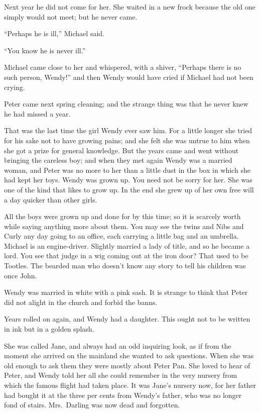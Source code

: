 Next year he did not come for her. She waited in a new frock because
the old one simply would not meet; but he never came.

``Perhaps he is ill,'' Michael said.

``You know he is never ill.''

Michael came close to her and whispered, with a shiver, ``Perhaps there
is no such person, Wendy!'' and then Wendy would have cried if Michael
had not been crying.

Peter came next spring cleaning; and the strange thing was that he
never knew he had missed a year.

That was the last time the girl Wendy ever saw him. For a little longer
she tried for his sake not to have growing pains; and she felt she was
untrue to him when she got a prize for general knowledge. But the years
came and went without bringing the careless boy; and when they met
again Wendy was a married woman, and Peter was no more to her than a
little dust in the box in which she had kept her toys. Wendy was grown
up. You need not be sorry for her. She was one of the kind that likes
to grow up. In the end she grew up of her own free will a day quicker
than other girls.

All the boys were grown up and done for by this time; so it is scarcely
worth while saying anything more about them. You may see the twins and
Nibs and Curly any day going to an office, each carrying a little bag
and an umbrella. Michael is an engine-driver. Slightly married a lady
of title, and so he became a lord. You see that judge in a wig coming
out at the iron door? That used to be Tootles. The bearded man who
doesn't know any story to tell his children was once John.

Wendy was married in white with a pink sash. It is strange to think
that Peter did not alight in the church and forbid the banns.

Years rolled on again, and Wendy had a daughter. This ought not to be
written in ink but in a golden splash.

She was called Jane, and always had an odd inquiring look, as if from
the moment she arrived on the mainland she wanted to ask questions.
When she was old enough to ask them they were mostly about Peter Pan.
She loved to hear of Peter, and Wendy told her all she could remember
in the very nursery from which the famous flight had taken place. It
was Jane's nursery now, for her father had bought it at the three per
cents from Wendy's father, who was no longer fond of stairs. Mrs.\ Darling was now dead and forgotten.

